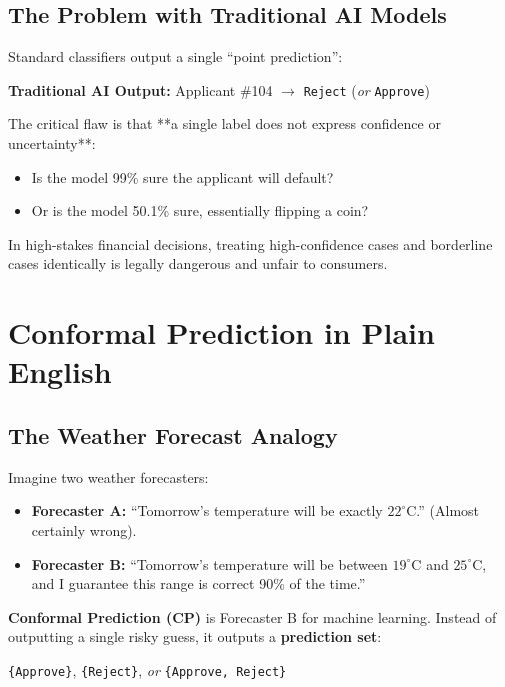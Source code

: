 \documentclass[11pt,a4paper]{article}
\begin{document}
\subsection{The Problem with Traditional AI Models}
Standard classifiers output a single ``point prediction'':
\begin{center}
    \textbf{Traditional AI Output:} \quad Applicant \#104 $\longrightarrow$ \texttt{Reject} \quad (\textit{or} \texttt{Approve})
\end{center}
The critical flaw is that **a single label does not express confidence or uncertainty**:
\begin{itemize}[leftmargin=1.5em]
    \item Is the model 99\% sure the applicant will default?
    \item Or is the model 50.1\% sure, essentially flipping a coin?
\end{itemize}
In high-stakes financial decisions, treating high-confidence cases and borderline cases identically is legally dangerous and unfair to consumers.

\section{Conformal Prediction in Plain English}

\subsection{The Weather Forecast Analogy}
Imagine two weather forecasters:
\begin{itemize}[leftmargin=1.5em]
    \item \textbf{Forecaster A:} ``Tomorrow's temperature will be exactly $22^\circ\text{C}$.'' (Almost certainly wrong).
    \item \textbf{Forecaster B:} ``Tomorrow's temperature will be between $19^\circ\text{C}$ and $25^\circ\text{C}$, and I guarantee this range is correct 90\% of the time.''
\end{itemize}
\textbf{Conformal Prediction (CP)} is Forecaster B for machine learning. Instead of outputting a single risky guess, it outputs a \textbf{prediction set}:
\begin{center}
    \texttt{\{Approve\}}, \quad \texttt{\{Reject\}}, \quad \textit{or} \quad \texttt{\{Approve, Reject\}}
\end{center}
\end{document}
